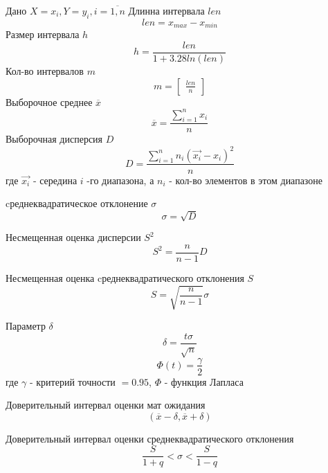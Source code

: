 \documentclass[oneside,final,14pt]{extreport}
\begin{document}
Дано $X = {x_i}, Y = {y_i}, i = \overline{1,n}$
Длинна интервала $len$
\begin{equation}
len
=
x_{max} - x_{min}
\end{equation}
Размер интервала $h$
\begin{equation}
h
=
\frac{len}{1 +3.28ln(len)}
\end{equation}
Кол-во интервалов $m$
\begin{equation}
m
=
\begin{bmatrix}
\frac{len}{n}
\end{bmatrix}
\end{equation}
Выборочное среднее $\overline{x}$
\begin{equation}
\overline{x}
=
\frac{
\sum\limits_{i=1}^n x_i
}
{n}
\end{equation}
Выборочная дисперсия $D$
\begin{equation}
D
=
\frac{
\sum\limits_{i=1}^n  n_i(\overrightarrow{x_i} - x_i)^2
}{n}
\end{equation}
 где $\overrightarrow{x_i}$ - середина $i$ -го диапазона, а $n_i$ -  кол-во элементов в этом диапазоне
 
cреднеквадратическое отклонение $\sigma$
\begin{equation}
\sigma
=
\sqrt{D}
\end{equation}

Несмещенная оценка дисперсии $S^2$
\begin{equation}
S^2
=
\frac{n}{n-1}
D
\end{equation}

Несмещенная оценка cреднеквадратического отклонения $S$
\begin{equation}
S
=
\sqrt{\frac{n}{n-1}}
\sigma
\end{equation}

Параметр $\delta$ 
\begin{equation}
\delta
=
\frac{t\sigma}{\sqrt{n}}
\end{equation}
\begin{equation}
\Phi(t)=
\frac{
\gamma
}
{2}
\end{equation}
где $\gamma$ - критерий точности $=0.95$, $\Phi$ - функция Лапласа

Доверительный интервал оценки мат ожидания
\begin{equation}
(\overline{x} - \delta,
\overline{x} + \delta)
\end{equation}

Доверительный интервал оценки среднеквадратического отклонения
\begin{equation}
\frac{S}{1+q}
<
\sigma
<
\frac{S}{1-q}
\end{equation}
\end{document}
